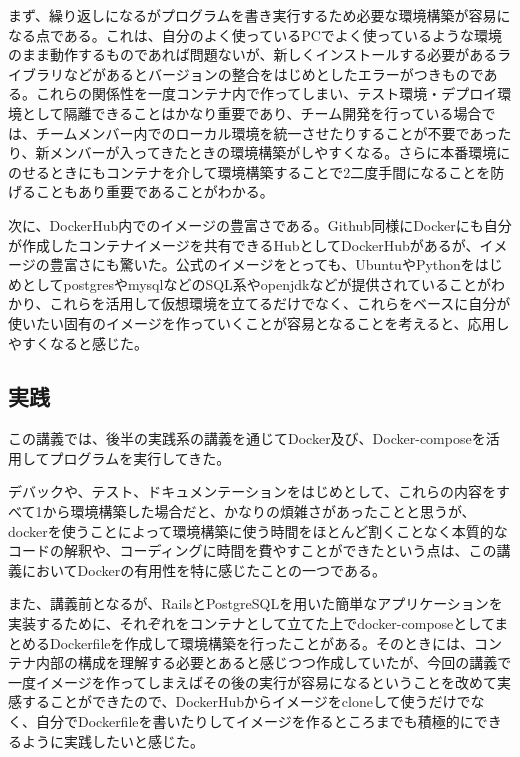 \documentclass[12pt]{jsarticle}
\begin{document}
まず、繰り返しになるがプログラムを書き実行するため必要な環境構築が容易になる点である。これは、自分のよく使っているPCでよく使っているような環境のまま動作するものであれば問題ないが、新しくインストールする必要があるライブラリなどがあるとバージョンの整合をはじめとしたエラーがつきものである。これらの関係性を一度コンテナ内で作ってしまい、テスト環境・デプロイ環境として隔離できることはかなり重要であり、チーム開発を行っている場合では、チームメンバー内でのローカル環境を統一させたりすることが不要であったり、新メンバーが入ってきたときの環境構築がしやすくなる。さらに本番環境にのせるときにもコンテナを介して環境構築することで2二度手間になることを防げることもあり重要であることがわかる。

次に、DockerHub内でのイメージの豊富さである。Github同様にDockerにも自分が作成したコンテナイメージを共有できるHubとしてDockerHubがあるが、イメージの豊富さにも驚いた。公式のイメージをとっても、UbuntuやPythonをはじめとしてpostgresやmysqlなどのSQL系やopenjdkなどが提供されていることがわかり、これらを活用して仮想環境を立てるだけでなく、これらをベースに自分が使いたい固有のイメージを作っていくことが容易となることを考えると、応用しやすくなると感じた。

\subsection{実践}
この講義では、後半の実践系の講義を通じてDocker及び、Docker-composeを活用してプログラムを実行してきた。

デバックや、テスト、ドキュメンテーションをはじめとして、これらの内容をすべて1から環境構築した場合だと、かなりの煩雑さがあったことと思うが、dockerを使うことによって環境構築に使う時間をほとんど割くことなく本質的なコードの解釈や、コーディングに時間を費やすことができたという点は、この講義においてDockerの有用性を特に感じたことの一つである。

また、講義前となるが、RailsとPostgreSQLを用いた簡単なアプリケーションを実装するために、それぞれをコンテナとして立てた上でdocker-composeとしてまとめるDockerfileを作成して環境構築を行ったことがある。そのときには、コンテナ内部の構成を理解する必要とあると感じつつ作成していたが、今回の講義で一度イメージを作ってしまえばその後の実行が容易になるということを改めて実感することができたので、DockerHubからイメージをcloneして使うだけでなく、自分でDockerfileを書いたりしてイメージを作るところまでも積極的にできるように実践したいと感じた。
\end{document}
